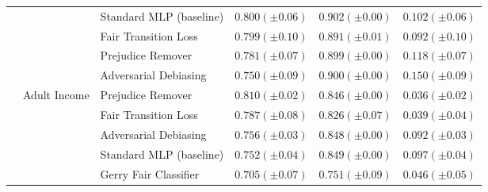 \begin{tabular}{llllll}
 &  & Standard MLP (baseline) & $0.800 (\pm0.06)$ & $0.902 (\pm0.00)$ & $0.102 (\pm0.06)$ \\
 &  & Fair Transition Loss & $0.799 (\pm0.10)$ & $0.891 (\pm0.01)$ & $0.092 (\pm0.10)$ \\
 &  & Prejudice Remover & $0.781 (\pm0.07)$ & $0.899 (\pm0.00)$ & $0.118 (\pm0.07)$ \\
 &  & Adversarial Debiasing & $0.750 (\pm0.09)$ & $0.900 (\pm0.00)$ & $0.150 (\pm0.09)$ \\
\cline{2-6}
 & \multirow[t]{5}{*}{Adult Income} & Prejudice Remover & $0.810 (\pm0.02)$ & $0.846 (\pm0.00)$ & $0.036 (\pm0.02)$ \\
 &  & Fair Transition Loss & $0.787 (\pm0.08)$ & $0.826 (\pm0.07)$ & $0.039 (\pm0.04)$ \\
 &  & Adversarial Debiasing & $0.756 (\pm0.03)$ & $0.848 (\pm0.00)$ & $0.092 (\pm0.03)$ \\
 &  & Standard MLP (baseline) & $0.752 (\pm0.04)$ & $0.849 (\pm0.00)$ & $0.097 (\pm0.04)$ \\
 &  & Gerry Fair Classifier & $0.705 (\pm0.07)$ & $0.751 (\pm0.09)$ & $0.046 (\pm0.05)$ \\
\cline{1-6} \cline{2-6}
\bottomrule
\end{tabular}
